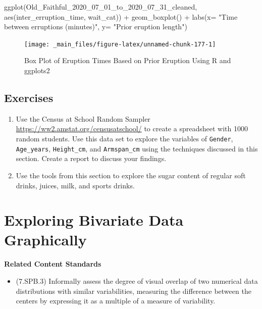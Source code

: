 \documentclass[
]{book}
\newenvironment{Shaded}{\begin{snugshade}}{\end{snugshade}}
\newcommand{\AttributeTok}[1]{\textcolor[rgb]{0.77,0.63,0.00}{#1}}
\newcommand{\FunctionTok}[1]{\textcolor[rgb]{0.00,0.00,0.00}{#1}}
\newcommand{\NormalTok}[1]{#1}
\newcommand{\SpecialCharTok}[1]{\textcolor[rgb]{0.00,0.00,0.00}{#1}}
\newcommand{\StringTok}[1]{\textcolor[rgb]{0.31,0.60,0.02}{#1}}
\providecommand{\tightlist}{%
  \setlength{\itemsep}{0pt}\setlength{\parskip}{0pt}}
\newenvironment{standards}{}{}
\theoremstyle{definition}
\theoremstyle{definition}
\theoremstyle{definition}
\theoremstyle{definition}
\theoremstyle{remark}
\begin{document}
\begin{Shaded}
\begin{Highlighting}[]
\FunctionTok{ggplot}\NormalTok{(Old\_Faithful\_2020\_07\_01\_to\_2020\_07\_31\_cleaned, }\FunctionTok{aes}\NormalTok{(inter\_erruption\_time, wait\_cat)) }\SpecialCharTok{+} \FunctionTok{geom\_boxplot}\NormalTok{() }\SpecialCharTok{+} \FunctionTok{labs}\NormalTok{(}\AttributeTok{x=} \StringTok{"Time between erruptions (minutes)"}\NormalTok{, }\AttributeTok{y=} \StringTok{"Prior eruption length"}\NormalTok{)}
\end{Highlighting}
\end{Shaded}

\begin{figure}

{\centering \texttt{[image: \_main\_files/figure-latex/unnamed-chunk-177-1]} 

}

\caption{Box Plot of Eruption Times Based on Prior Eruption Using R and ggplots2}\label{fig:unnamed-chunk-177}
\end{figure}

\hypertarget{exercises-60}{%
\subsection{Exercises}\label{exercises-60}}

\begin{enumerate}
\def\labelenumi{\arabic{enumi}.}
\item
  Use the Census at School Random Sampler \url{https://ww2.amstat.org/censusatschool/} to create a spreadsheet with 1000 random students. Use this data set to explore the variables of \texttt{Gender}, \texttt{Age\_years}, \texttt{Height\_cm}, and \texttt{Armspan\_cm} using the techniques discussed in this section. Create a report to discuss your findings.
\item
  Use the tools from this section to explore the sugar content of regular soft drinks, juices, milk, and sports drinks.
\end{enumerate}

\hypertarget{exploring-bivariate-data-graphically}{%
\section{Exploring Bivariate Data Graphically}\label{exploring-bivariate-data-graphically}}

\begin{standards}

\begin{center}
\textbf{Related Content Standards}

\end{center}

\begin{itemize}
\tightlist
\item
  (7.SPB.3) Informally assess the degree of visual overlap of two numerical data distributions with similar variabilities, measuring the difference between the centers by expressing it as a multiple of a measure of variability.
\end{itemize}

\end{standards}
\end{document}
